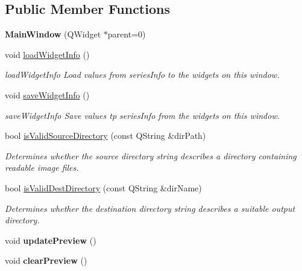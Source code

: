\subsection*{Public Member Functions}
\begin{DoxyCompactItemize}
\item 
\mbox{\label{class_main_window_a8b244be8b7b7db1b08de2a2acb9409db}} 
{\bfseries Main\+Window} (Q\+Widget $\ast$parent=0)
\item 
\mbox{\label{class_main_window_a72e20beaa72b85bd6590e959f19a1a3c}} 
void \hyperlink{class_main_window_a72e20beaa72b85bd6590e959f19a1a3c}{load\+Widget\+Info} ()
\begin{DoxyCompactList}\small\item\em load\+Widget\+Info Load values from series\+Info to the widgets on this window. \end{DoxyCompactList}\item 
\mbox{\label{class_main_window_a8b291e7ff1acfac3e694e5773508db9e}} 
void \hyperlink{class_main_window_a8b291e7ff1acfac3e694e5773508db9e}{save\+Widget\+Info} ()
\begin{DoxyCompactList}\small\item\em save\+Widget\+Info Save values tp series\+Info from the widgets on this window. \end{DoxyCompactList}\item 
bool \hyperlink{class_main_window_a9c938dcc890c7a6d8f8df98877b1acec}{is\+Valid\+Source\+Directory} (const Q\+String \&dir\+Path)
\begin{DoxyCompactList}\small\item\em Determines whether the source directory string describes a directory containing readable image files. \end{DoxyCompactList}\item 
bool \hyperlink{class_main_window_ae3a95084dfba8d357b4dad44a97c0d75}{is\+Valid\+Dest\+Directory} (const Q\+String \&dir\+Name)
\begin{DoxyCompactList}\small\item\em Determines whether the destination directory string describes a suitable output directory. \end{DoxyCompactList}\item 
\mbox{\label{class_main_window_a46b10fae330fb120408ff5ecf4d93917}} 
void {\bfseries update\+Preview} ()
\item 
\mbox{\label{class_main_window_a70f1571a374bc94df84f935f8af0fffe}} 
void {\bfseries clear\+Preview} ()
\end{DoxyCompactItemize}


